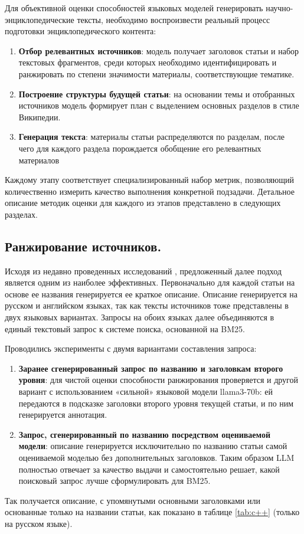 \documentclass{article}
\theoremstyle{definition}
\theoremstyle{plain}
\begin{document}
Для объективной оценки способностей языковых моделей генерировать научно-энциклопедические тексты, необходимо воспроизвести реальный процесс подготовки энциклопедического контента:
\begin{enumerate}

    \item \textbf{Отбор релевантных источников}: модель получает заголовок статьи и набор текстовых фрагментов, среди которых необходимо идентифицировать и ранжировать по степени значимости материалы, соответствующие тематике. 
    
    \item \textbf{Построение структуры будущей статьи}: на основании темы и отобранных источников модель формирует план с выделением основных разделов в стиле Википедии.
    
    \item \textbf{Генерация текста}: материалы статьи распределяются по разделам, после чего для каждого раздела порождается обобщение его релевантных материалов

\end{enumerate}
Каждому этапу соответствует специализированный набор метрик, позволяющий количественно измерить качество выполнения конкретной подзадачи. 
Детальное описание методик оценки для каждого из этапов представлено в следующих разделах.
\subsection*{Ранжирование источников.}
Исходя из недавно проведенных исследований \cite{rerank}, предложенный далее подход является одним из наиболее эффективных.
Первоначально для каждой статьи на основе ее названия генерируется ее краткое описание. 
Описание генерируется на русском и английском языках, так как тексты источников тоже представлены в двух языковых вариантах. 
Запросы на обоих языках далее объединяются в единый текстовый запрос к системе поиска, основанной на BM25. 

Проводились эксперименты с двумя вариантами составления запроса:
\begin{enumerate}

    \item \textbf{Заранее сгенерированный запрос по названию и заголовкам второго уровня}: для чистой оценки способности ранжирования проверяется и другой вариант с использованием «сильной» языковой модели llama3-70b: 
    ей передаются в подсказке заголовки второго уровня текущей статьи, и по ним генерируется аннотация.  
    
    \item \textbf{Запрос, сгенерированный по названию посредством оцениваемой модели}: описание генерируется исключительно по названию статьи самой оцениваемой моделью без дополнительных заголовков.
    Таким образом LLM полностью отвечает за качество выдачи и самостоятельно решает, какой поисковый запрос лучше сформулировать для BM25.

\end{enumerate}
Так получается описание, с упомянутыми основными заголовками или основанные только на названии статьи, как показано в таблице \ref{tab:c++} (только на русском языке).
\end{document}
